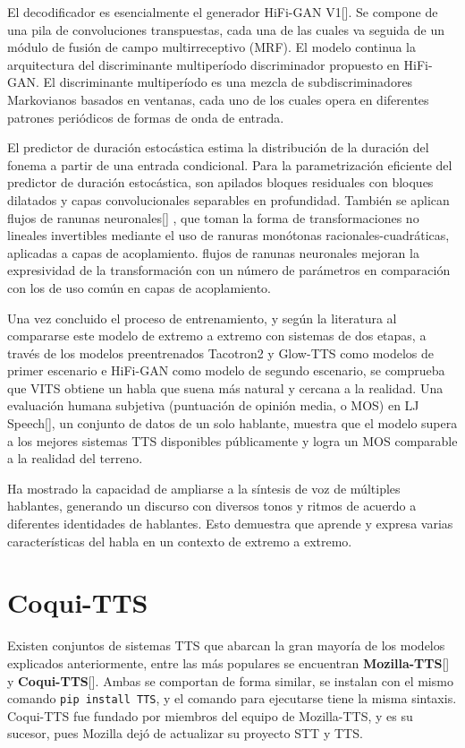 El decodificador es esencialmente el generador HiFi-GAN V1[\cite{kong2020hifi}]. Se compone de una pila de convoluciones transpuestas, cada una de las cuales va seguida de un módulo de fusión de campo multirreceptivo (MRF). El modelo continua la arquitectura del discriminante multiperíodo discriminador propuesto en HiFi-GAN. El discriminante multiperíodo es una mezcla de subdiscriminadores Markovianos basados en ventanas, cada uno de los cuales opera en diferentes patrones periódicos de formas de onda de entrada.

El predictor de duración estocástica estima la distribución de la duración del fonema a partir de una entrada condicional. Para la parametrización eficiente del predictor de duración estocástica, son apilados bloques residuales con bloques dilatados y capas convolucionales separables en profundidad. También se aplican flujos de ranunas neuronales[\cite{durkan2019neural}] , que toman la forma de transformaciones no lineales invertibles mediante el uso de ranuras monótonas racionales-cuadráticas, aplicadas a capas de acoplamiento. flujos de ranunas neuronales mejoran la expresividad de la transformación con un número de parámetros en comparación con los de uso común en capas de acoplamiento. 

Una vez concluido el proceso de entrenamiento, y según la literatura al compararse este modelo de extremo a extremo con sistemas de dos etapas, a través de los modelos preentrenados Tacotron2 y Glow-TTS como modelos de primer escenario e HiFi-GAN como modelo de segundo escenario, se comprueba que VITS obtiene un habla que suena más natural y cercana a la realidad. Una evaluación humana subjetiva (puntuación de opinión media, o MOS) en LJ Speech[\cite{ljspeech}], un conjunto de datos de un solo hablante, muestra que el modelo supera a los mejores sistemas TTS disponibles públicamente y logra un MOS comparable a la realidad del terreno.

Ha mostrado la capacidad de ampliarse a la síntesis de voz de múltiples hablantes, generando un discurso con diversos tonos y ritmos de acuerdo a diferentes identidades de hablantes. Esto demuestra que aprende y expresa varias características del habla en un contexto de extremo a extremo.\\

\section{Coqui-TTS}
Existen conjuntos de sistemas TTS que abarcan la gran mayoría de los modelos explicados anteriormente, entre las más populares se encuentran \textbf{Mozilla-TTS}[\cite{mozilla-doc}] y \textbf{Coqui-TTS}[\cite{coqui-doc}]. Ambas se comportan de forma similar, se instalan con el mismo comando \texttt{pip install TTS}, y el comando para ejecutarse tiene la misma sintaxis. Coqui-TTS fue fundado por miembros del equipo de Mozilla-TTS, y es su sucesor, pues Mozilla dejó de actualizar su proyecto STT y TTS.

